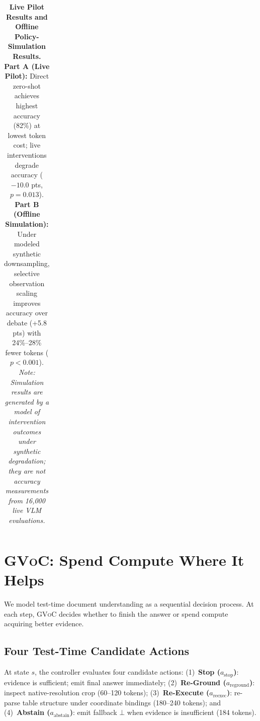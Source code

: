 \documentclass[11pt]{article}
\begin{document}
\begin{table}[t]
\begin{tabularx}{\textwidth}{@{} p{3.8cm} c c c X @{}}
\bottomrule
\end{tabularx}
\vspace{-2.5mm}
\caption{\textbf{Live Pilot Results and Offline Policy-Simulation Results.} \textbf{Part A (Live Pilot):} Direct zero-shot achieves highest accuracy (82\%) at lowest token cost; live interventions degrade accuracy ($-10.0$ pts, $p=0.013$). \textbf{Part B (Offline Simulation):} Under modeled synthetic downsampling, selective observation scaling improves accuracy over debate (+5.8 pts) with 24\%--28\% fewer tokens ($p < 0.001$). \textit{Note: Simulation results are generated by a model of intervention outcomes under synthetic degradation; they are not accuracy measurements from 16,000 live VLM evaluations.}}
\label{tab:main_results}
\vspace{-3mm}
\end{table}

\section{\textsc{GVoC}: Spend Compute Where It Helps}
\label{sec:method}

We model test-time document understanding as a sequential decision process. At each step, \textsc{GVoC} decides whether to finish the answer or spend compute acquiring better evidence.

\subsection{Four Test-Time Candidate Actions}
At state $s$, the controller evaluates four candidate actions: (1)~\textbf{Stop ($a_{\text{stop}}$)}: evidence is sufficient; emit final answer immediately; (2)~\textbf{Re-Ground ($a_{\text{reground}}$)}: inspect native-resolution crop (60--120 tokens); (3)~\textbf{Re-Execute ($a_{\text{reexec}}$)}: re-parse table structure under coordinate bindings (180--240 tokens); and (4)~\textbf{Abstain ($a_{\text{abstain}}$)}: emit fallback $\bot$ when evidence is insufficient (184 tokens).
\end{document}
